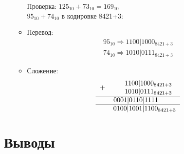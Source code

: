 \documentclass[oneside,a4paper,14pt]{extarticle} %
\begin{document}
\begin{enumerate}
\begin{itemize}
                Проверка: $125_{10} + 73_{10} = 169_{10}$\\
            
            $95_{10} + 74_{10}$ в кодировке 8421+3:
                \item Перевод:
                    $$
                        \begin{array}{c}
                            95_{10} \Rightarrow 1100|1000_{8421+3}\\
                            74_{10} \Rightarrow 1010|0111_{8421+3}
                        \end{array}
                    $$
                \item Сложение:
                    $$
                        \begin{tabular}{{c}{r}}
                            \texttt{$+$ }&
                            \begin{tabular}{c}
                                \texttt{$1100|1000_{8421+3}$}\\
                                \texttt{$1010|0111_{8421+3}$}\\
                            \end{tabular}\\
                            \hline
                            & \texttt{$0001|0110|1111~~~~~$}\\
                            \hline
                            & \texttt{$0100|1001|1100_{8421+3}$}
                        \end{tabular}
                    $$
            \end{itemize}
    \end{enumerate}
    
   \section*{Выводы}
   
\end{document}
